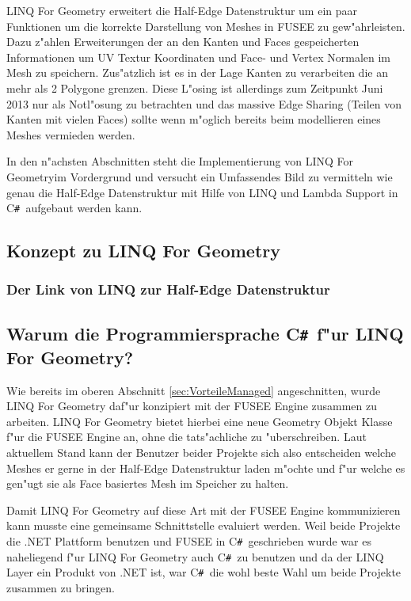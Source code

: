 \documentclass[pagesize, paper=a4, fontsize=12pt,titlepage=true, headings=small, headnosepline, abstractoff, liststotoc, nochapterprefix, plainheadsepline]{scrreprt}
\newcommand{\CSS}{C\texttt{\# }}
\newcommand{\LFG}{LINQ For Geometry}
\newcommand{\LFGS}{LINQ For Geometry }
\newcommand{\HES}{Half-Edge Datenstruktur }
\begin{document}
\LFGS erweitert die \HES um ein paar Funktionen um die korrekte Darstellung von Meshes in FUSEE zu gew"ahrleisten. Dazu z"ahlen Erweiterungen der an den Kanten und Faces gespeicherten Informationen um UV Textur Koordinaten und Face- und Vertex Normalen im Mesh zu speichern.
Zus"atzlich ist es in der Lage Kanten zu verarbeiten die an mehr als 2 Polygone grenzen. Diese L"osing ist allerdings zum Zeitpunkt Juni 2013 nur als Notl"osung zu betrachten und das massive Edge Sharing (Teilen von Kanten mit vielen Faces) sollte wenn m"oglich bereits beim modellieren eines Meshes vermieden werden.
\newline

In den n"achsten Abschnitten steht die Implementierung von \LFG im Vordergrund und versucht ein Umfassendes Bild zu vermitteln wie genau die \HES mit Hilfe von LINQ und Lambda Support in \CSS aufgebaut werden kann.
\newline
		\subsection {Konzept zu \LFG}
			\subsubsection {Der Link von LINQ zur \HES}
		\subsection {Warum die Programmiersprache \CSS f"ur \LFG?}
			Wie bereits  im oberen Abschnitt \ref{sec:VorteileManaged} angeschnitten, wurde \LFGS daf"ur konzipiert mit der FUSEE Engine zusammen zu arbeiten. \LFGS bietet hierbei eine neue Geometry Objekt Klasse f"ur die FUSEE Engine an, ohne die tats"achliche zu "uberschreiben. Laut aktuellem Stand kann der Benutzer beider Projekte sich also entscheiden welche Meshes er gerne in der \HES laden m"ochte und f"ur welche es gen"ugt sie als Face basiertes Mesh im Speicher zu halten.

Damit \LFGS auf diese Art mit der FUSEE Engine kommunizieren kann musste eine gemeinsame Schnittstelle evaluiert werden. Weil beide Projekte die .NET Plattform benutzen und FUSEE in \CSS geschrieben wurde war es naheliegend f"ur \LFGS auch \CSS zu benutzen und da der LINQ Layer ein Produkt von .NET ist, war \CSS die wohl beste Wahl um beide Projekte zusammen zu bringen.
\end{document}
